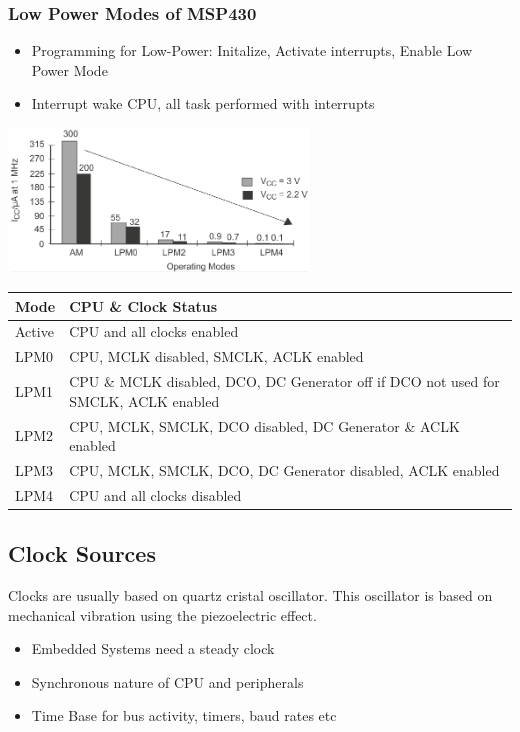 \subsubsection{Low Power Modes of MSP430}
\begin{minipage}{11cm}
	\begin{itemize}
		\item Programming for Low-Power: Initalize, Activate interrupts, Enable Low Power Mode
		\item Interrupt wake CPU, all task performed with interrupts
	\end{itemize}
\end{minipage}
		\begin{minipage}{8cm}
	\includegraphics[width=8cm]{images/lowpower.png}
\end{minipage}
\begin{tabular}{|l|l|}
	\hline
	\textbf{Mode} & \textbf{CPU \& Clock Status}\\
	\hline
	Active & CPU and all clocks enabled\\
	\hline
	LPM0 & CPU, MCLK disabled, SMCLK, ACLK enabled \\
	\hline
	LPM1 & CPU \& MCLK disabled, DCO, DC Generator off if DCO not used for SMCLK, ACLK enabled\\
	\hline
	LPM2 & CPU, MCLK, SMCLK, DCO disabled, DC Generator \& ACLK enabled\\
	\hline
	LPM3 & CPU, MCLK, SMCLK, DCO, DC Generator disabled, ACLK enabled\\
	\hline
	LPM4 & CPU and all clocks disabled\\
	\hline	
\end{tabular}


\subsection{Clock Sources }
Clocks are usually based on quartz cristal oscillator. This oscillator is based on mechanical vibration using the piezoelectric effect. 
\begin{itemize}
	\item Embedded Systems need a steady clock
	\item Synchronous nature of CPU and peripherals
	\item Time Base for bus activity, timers, baud rates etc
\end{itemize}
